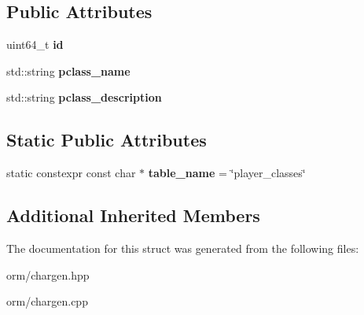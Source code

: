 \subsection*{Public Attributes}
\begin{DoxyCompactItemize}
\item 
\mbox{\label{structmods_1_1orm_1_1player__classes_a30237ea2db2a03ef14bd4fcb79db754f}} 
uint64\+\_\+t {\bfseries id}
\item 
\mbox{\label{structmods_1_1orm_1_1player__classes_ae06b81583ac8c40fc7d39bebeb94f17b}} 
std\+::string {\bfseries pclass\+\_\+name}
\item 
\mbox{\label{structmods_1_1orm_1_1player__classes_adb10e56a5801da05c8da166bd3f6a92f}} 
std\+::string {\bfseries pclass\+\_\+description}
\end{DoxyCompactItemize}
\subsection*{Static Public Attributes}
\begin{DoxyCompactItemize}
\item 
\mbox{\label{structmods_1_1orm_1_1player__classes_a8ce643ccc8239d42e607f6a0ed518cab}} 
static constexpr const char $\ast$ {\bfseries table\+\_\+name} = \char`\"{}player\+\_\+classes\char`\"{}
\end{DoxyCompactItemize}
\subsection*{Additional Inherited Members}


The documentation for this struct was generated from the following files\+:\begin{DoxyCompactItemize}
\item 
orm/chargen.\+hpp\item 
orm/chargen.\+cpp\end{DoxyCompactItemize}
